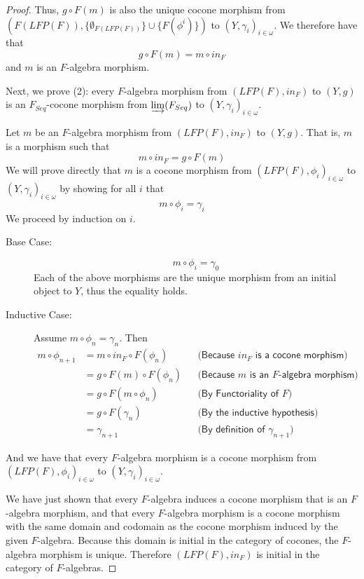 \documentclass{msthesis}
\theoremstyle{definition}
\newcommand{\colim}{\varinjlim}
\begin{document}
\begin{proof}
    Thus, $g \circ F(m)$ is also the unique cocone morphism from $(F(LFP(F)), \{\emptyset_{F(LFP(F))}\} \cup \{ F(\phi^{i})\})$ to $(Y, \gamma_i)_{i \in \omega}$. We therefore have that
    \[ g \circ F(m) = m \circ in_F \]
    and $m$ is an $F$-algebra morphism.

    Next, we prove (2): every $F$-algebra morphism from $(LFP(F), in_F)$ to $(Y, g)$ is an $F_{Seq}$-cocone morphism from $\colim(F_{Seq})$ to $(Y, \gamma_i)_{i \in \omega}$.

    Let $m$ be an $F$-algebra morphism from $(LFP(F), in_F)$ to $(Y, g)$.  That is, $m$ is a morphism such that
    \begin{equation}\label{eq:mfalgmorphism}
        m \circ in_F = g \circ F(m)
    \end{equation}
    We will prove directly that $m$ is a cocone morphism from $(LFP(F), \phi_i)_{i \in \omega}$ to $(Y, \gamma_i)_{i \in \omega}$ by showing for all $i$ that
    \[ m \circ \phi_i = \gamma_i \]
    We proceed by induction on $i$.
    \begin{description}
        \item[Base Case:]
            \[ m \circ \phi_i = \gamma_0 \]
            Each of the above morphisms are the unique morphism from an initial object to $Y$, thus the equality holds.
        \item[Inductive Case:] Assume $m \circ \phi_n = \gamma_n$.  Then
        \begin{align*}
            m \circ \phi_{n+1} &= m \circ in_F \circ F(\phi_n) && \textsf{(Because $in_F$ is a cocone morphism)} \\
            &= g \circ F(m) \circ F(\phi_n)   && \textsf{(Because $m$ is an $F$-algebra morphism)} \\
            &= g \circ F(m \circ \phi_n) && \textsf{(By Functoriality of $F$)} \\
            &= g \circ F(\gamma_n) && \textsf{(By the inductive hypothesis)} \\
            &= \gamma_{n+1} && \textsf{(By definition of $\gamma_{n+1}$)}
        \end{align*}
    \end{description}
    And we have that every $F$-algebra morphism is a cocone morphism from $(LFP(F), \phi_i)_{i \in \omega}$ to $(Y, \gamma_i)_{i \in \omega}$. 
    
    We have just shown that every $F$-algebra induces a cocone morphism that is an $F$-algebra morphism, and that every $F$-algebra morphism is a cocone morphism with the same domain and codomain as the cocone morphism induced by the given $F$-algebra.  Because this domain is initial in the category of cocones, the $F$-algebra morphism is unique.  Therefore $(LFP(F), in_F)$ is initial in the category of $F$-algebras.
\end{proof}
\end{document}
